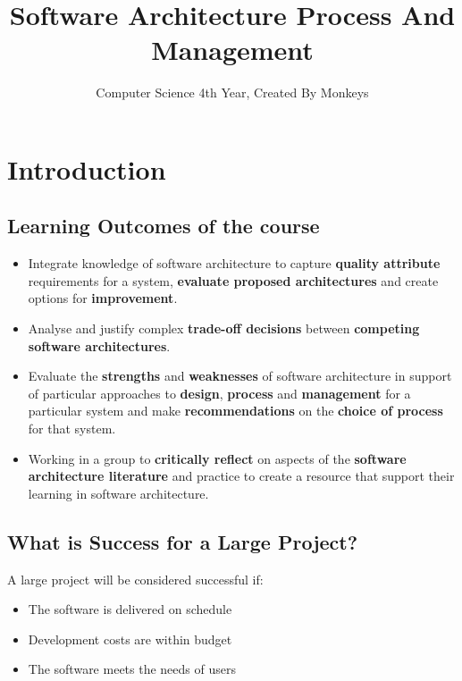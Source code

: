 \documentclass[a4paper]{article}
\begin{document}
\title{Software Architecture Process And Management}
\date{}
\author{Computer Science 4th Year, Created By Monkeys}
\maketitle
\newpage

\tableofcontents
\newpage


\section{Introduction}
\subsection{Learning Outcomes of the course}
\begin{itemize}
\item Integrate knowledge of software architecture to capture \textbf{quality attribute} requirements for a system, \textbf{evaluate proposed architectures} and create options for \textbf{improvement}.

\item Analyse and justify complex \textbf{trade-off decisions} between \textbf{competing software architectures}.

\item Evaluate the \textbf{strengths} and \textbf{weaknesses} of software architecture in support of particular approaches to \textbf{design}, \textbf{process} and \textbf{management} for a particular system and make \textbf{recommendations} on the \textbf{choice of process} for that system.

\item Working in a group to \textbf{critically reflect} on aspects of the \textbf{software architecture literature} and practice to create a resource that support their learning in software architecture.
\end{itemize}

\subsection{What is Success for a Large Project?}
A large project will be considered successful if:
\begin{itemize}
\item The software is delivered on schedule
\item Development costs are within budget
\item The software meets the needs of users
\end{itemize}
\end{document}
